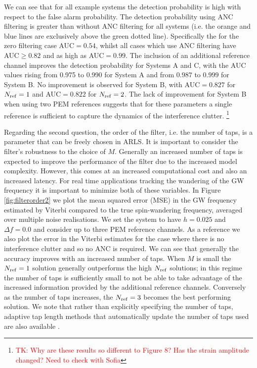 \documentclass[pra,superscriptaddress,reprint,amsmath,amssymb,nofootinbib]{revtex4-2}
\begin{document}
We can see that for all example systems the detection probability is high with respect to the false alarm probability. The detection probability using ANC filtering is greater than without ANC filtering for all systems (i.e. the orange and blue lines are exclusively above the green dotted line). Specifically the for the zero filtering case AUC$=0.54$, whilst all cases which use ANC filtering have AUC$\ge 0.82$ and as high as AUC$=0.99$. The inclusion of an additional reference channel improves the detection probability for Systems A and C, with the AUC values rising from 0.975 to 0.990 for System A and from $0.987$ to $0.999$ for System B. No improvement is observed for System B, with AUC$=0.827$ for $N_{\rm ref} =1$ and AUC$=0.822$ for $N_{\rm ref} =2$. The lack of improvement for System B when using two PEM references suggests that for these parameters a single reference is sufficient to capture the dynamics of the interference clutter. \newline  \footnote{\tiny \textcolor{red}{TK: Why are these results so different to Figure 8? Has the strain amplitude changed? Need to check with Sofia}\normalsize}

Regarding the second question, the order of the filter, i.e. the number of taps, is a parameter that can be freely chosen in ARLS. It is important to consider the filter's robustness to the choice of $M$. Generally an increased number of taps is expected to improve the performance of the filter due to the increased model complexity. However, this comes at an increased computational cost and also an increased latency. For real time applications tracking the wandering of the GW frequency it is important to minimize both of these variables. In Figure  \ref{fig:filterorder2} we plot the mean squared error (MSE) in the GW frequency estimated by Viterbi compared to the true spin-wandering frequency, averaged over multiple noise realisations. We set the system to have $h=0.025$ and $\Delta f =0.0$ and consider up to three PEM reference channels. As a reference we also plot the error in the Viterbi estimates for the case where there is no interference clutter and so no ANC is required. We can see that generally the accuracy improves with an increased number of taps. When $M$ is small the $N_{\rm ref} =1$ solution generally outperforms the high $N_{\rm ref}$ solutions; in this regime the number of taps is sufficiently small to not be able to take advantage of the increased information provided by the additional reference channels. Conversely as the number of taps increases, the $N_{\rm ref} =3$ becomes the best performing solution. We note that rather than explicitly specifying the number of taps, adaptive tap length methods that automatically update the number of taps used are also available \citep[e.g.][]{1326385,KAR2017422,KAR2020107043}.
\end{document}
